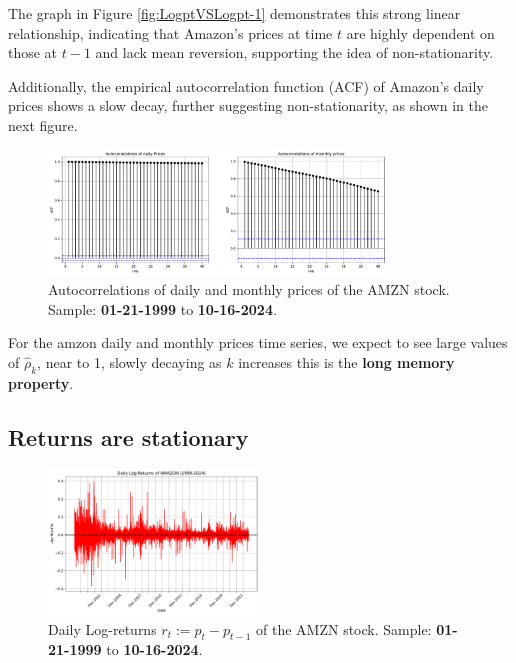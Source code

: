 \documentclass{article}
\begin{document}
\noindent The graph in Figure \ref{fig:LogptVSLogpt-1} demonstrates this strong linear 
relationship, indicating that Amazon's prices at time \( t \) are highly dependent on those at \( t-1 \) and lack mean reversion,
 supporting the idea of non-stationarity.

\noindent Additionally, the empirical autocorrelation function (ACF) of Amazon's daily prices shows a slow decay, further suggesting non-stationarity, as shown in the next figure.

\begin{figure}[H]
    \centering
    \includegraphics[width=0.8\textwidth]{Img/Autocorrel_daily_monthly.pdf}
    \caption{Autocorrelations of daily and monthly prices of the AMZN stock.
    Sample: \textbf{01-21-1999} to \textbf{10-16-2024}.}

    \label{fig:Autocorrelations_daily_monthly}
\end{figure}

\noindent For the amzon daily and monthly prices time series, we expect to see large values of $\hat{\rho}_k$, near to 1, slowly decaying as $k$ increases this is the \textbf{long memory property}.

\subsection{Returns are stationary}

\begin{figure}[H]
    \centering
    \includegraphics[width=0.5\textwidth]{Img/Daily_Log_Returns.pdf}
    \caption{Daily Log-returns $r_t := p_t - p_{t-1}$ of the AMZN stock.
    Sample: \textbf{01-21-1999} to \textbf{10-16-2024}.}
    \label{fig:Daily_log_returns}
\end{figure}
\end{document}
